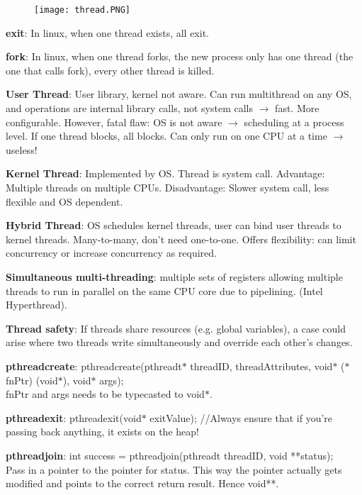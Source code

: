 \documentclass[a4paper,landscape]{article}
\newcommand{\rnname}[1]{\textbf{#1}}
\begin{document}
\begin{multicols*}{4}
\begin{flatitemize}
\begin{figure}[H]
  \texttt{[image: thread.PNG]}
\end{figure}
\vspace{-1.5em}

\item \rnname{exit}: In linux, when one thread exists, all exit.
\item \rnname{fork}: In linux, when one thread forks, the new process only has one thread (the one that calls fork), every other thread is killed.
\item \rnname{User Thread}: User library, kernel not aware. Can run multithread on any OS, and operations are internal library calls, not system calls $\rightarrow$ fast. More configurable. However, fatal flaw: OS is not aware $\rightarrow$ scheduling at a process level. If one thread blocks, all blocks. Can only run on one CPU at a time $\rightarrow$ useless!
\item \rnname{Kernel Thread}: Implemented by OS. Thread is system call. Advantage: Multiple threads on multiple CPUs. Disadvantage: Slower system call, less flexible and OS dependent.
\item \rnname{Hybrid Thread}: OS schedules kernel threads, user can bind user threads to kernel threads. Many-to-many, don't need one-to-one. Offers flexibility: can limit concurrency or increase concurrency as required.
\item \rnname{Simultaneous multi-threading}: multiple sets of registers allowing multiple threads to run in parallel on the same CPU core due to pipelining. (Intel Hyperthread).
\item \rnname{Thread safety}: If threads share resources (e.g. global variables), a case could arise where two threads write simultaneously and override each other's changes.
\item \rnname{pthread\textunderscore create}: pthread\textunderscore create(pthread\textunderscore t$*$ threadID, threadAttributes, void$*$ ($*$fnPtr) (void$*$), void$*$ args);\\
fnPtr and args needs to be typecasted to void$*$.
\item \rnname{pthread\textunderscore exit}: pthread\textunderscore exit(void$*$ exitValue); //Always ensure that if you're passing back anything, it exists on the heap!
\item \rnname{pthread\textunderscore join}: int success = pthread\textunderscore join(pthread\textunderscore t threadID, void **status); \\ Pass in a pointer to the pointer for status. This way the pointer actually gets modified and points to the correct return result. Hence void**.


\end{flatitemize}
\end{multicols*}
\end{document}
